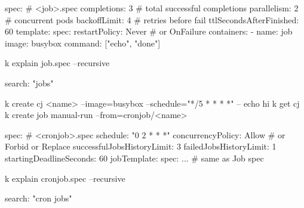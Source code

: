 
\begin{cheatcodebash}
spec:                   # <job>.spec
  completions: 3        # total successful completions
  parallelism: 2        # concurrent pods
  backoffLimit: 4       # retries before fail
  ttlSecondsAfterFinished: 60
  template:
    spec:
      restartPolicy: Never  # or OnFailure
      containers:
      - name: job
        image: busybox
        command: ["echo", "done"]
\end{cheatcodebash}

\begin{cheatcodebash}
k explain job.spec --recursive
\end{cheatcodebash}

\begin{cheatcodebash}
search: "jobs"
\end{cheatcodebash}


\begin{cheatcodebash}
k create cj <name> --image=busybox --schedule="*/5 * * * *" -- echo hi
k get cj
k create job manual-run --from=cronjob/<name>
\end{cheatcodebash}

\begin{cheatcodebash}
spec:                       # <cronjob>.spec
  schedule: "0 2 * * *"
  concurrencyPolicy: Allow  # or Forbid or Replace
  successfulJobsHistoryLimit: 3
  failedJobsHistoryLimit: 1
  startingDeadlineSeconds: 60
  jobTemplate:
    spec: ...               # same as Job spec
\end{cheatcodebash}

\begin{cheatcodebash}
k explain cronjob.spec --recursive
\end{cheatcodebash}

\begin{cheatcodebash}
search: "cron jobs"
\end{cheatcodebash}


